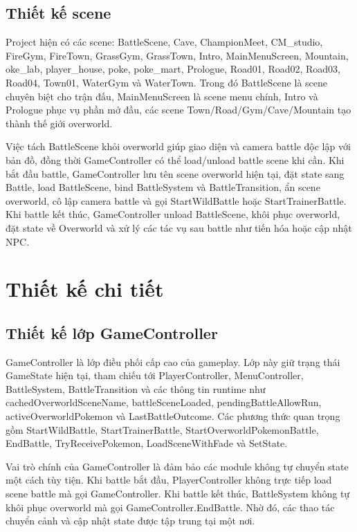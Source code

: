\subsection{Thiết kế scene}

Project hiện có các scene: BattleScene, Cave, ChampionMeet, CM\_studio, FireGym, FireTown, GrassGym, GrassTown, Intro, MainMenuScreen, Mountain, oke\_lab, player\_house, poke, poke\_mart, Prologue, Road01, Road02, Road03, Road04, Town01, WaterGym và WaterTown. Trong đó BattleScene là scene chuyên biệt cho trận đấu, MainMenuScreen là scene menu chính, Intro và Prologue phục vụ phần mở đầu, các scene Town/Road/Gym/Cave/Mountain tạo thành thế giới overworld.

Việc tách BattleScene khỏi overworld giúp giao diện và camera battle độc lập với bản đồ, đồng thời GameController có thể load/unload battle scene khi cần. Khi bắt đầu battle, GameController lưu tên scene overworld hiện tại, đặt state sang Battle, load BattleScene, bind BattleSystem và BattleTransition, ẩn scene overworld, cô lập camera battle và gọi StartWildBattle hoặc StartTrainerBattle. Khi battle kết thúc, GameController unload BattleScene, khôi phục overworld, đặt state về Overworld và xử lý các tác vụ sau battle như tiến hóa hoặc cập nhật NPC.

\section{Thiết kế chi tiết}

\subsection{Thiết kế lớp GameController}

GameController là lớp điều phối cấp cao của gameplay. Lớp này giữ trạng thái GameState hiện tại, tham chiếu tới PlayerController, MenuController, BattleSystem, BattleTransition và các thông tin runtime như cachedOverworldSceneName, battleSceneLoaded, pendingBattleAllowRun, activeOverworldPokemon và LastBattleOutcome. Các phương thức quan trọng gồm StartWildBattle, StartTrainerBattle, StartOverworldPokemonBattle, EndBattle, TryReceivePokemon, LoadSceneWithFade và SetState.

Vai trò chính của GameController là đảm bảo các module không tự chuyển state một cách tùy tiện. Khi battle bắt đầu, PlayerController không trực tiếp load scene battle mà gọi GameController. Khi battle kết thúc, BattleSystem không tự khôi phục overworld mà gọi GameController.EndBattle. Nhờ đó, các thao tác chuyển cảnh và cập nhật state được tập trung tại một nơi.

